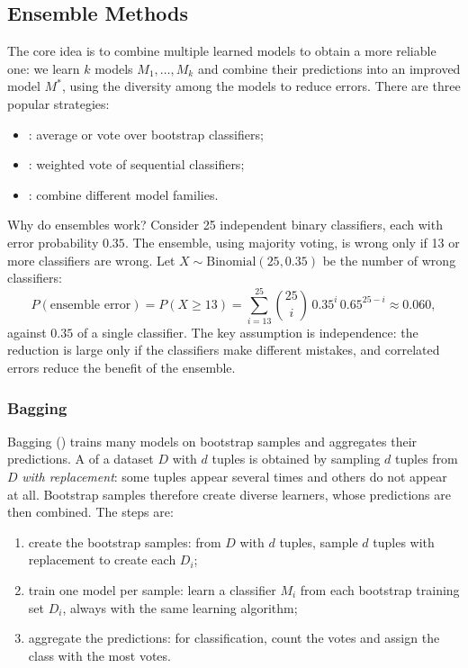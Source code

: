 \subsection{Ensemble Methods}

The core idea is to combine multiple learned models to obtain a more reliable one: we learn $k$ models $M_1, \dots, M_k$ and combine their predictions into an improved model $M^*$, using the diversity among the models to reduce errors. There are three popular strategies:
\begin{itemize}
    \item {}: average or vote over bootstrap classifiers;
    \item {}: weighted vote of sequential classifiers;
    \item {}: combine different model families.
\end{itemize}

\begin{example}
Why do ensembles work? Consider 25 independent binary classifiers, each with error probability $0.35$. The ensemble, using majority voting, is wrong only if 13 or more classifiers are wrong. Let $X \sim \mathrm{Binomial}(25, 0.35)$ be the number of wrong classifiers:
\[
  P(\text{ensemble error}) = P(X \ge 13) = \sum_{i=13}^{25} \binom{25}{i}\, 0.35^i\, 0.65^{25-i} \approx 0.060,
\]
against $0.35$ of a single classifier. The key assumption is independence: the reduction is large only if the classifiers make different mistakes, and correlated errors reduce the benefit of the ensemble.
\end{example}

\subsubsection{Bagging}

Bagging () trains many models on bootstrap samples and aggregates their predictions. A  of a dataset $D$ with $d$ tuples is obtained by sampling $d$ tuples from $D$ \emph{with replacement}: some tuples appear several times and others do not appear at all. Bootstrap samples therefore create diverse learners, whose predictions are then combined. The steps are:
\begin{enumerate}
    \item create the bootstrap samples: from $D$ with $d$ tuples, sample $d$ tuples with replacement to create each $D_i$;
    \item train one model per sample: learn a classifier $M_i$ from each bootstrap training set $D_i$, always with the same learning algorithm;
    \item aggregate the predictions: for classification, count the votes and assign the class with the most votes.
\end{enumerate}

